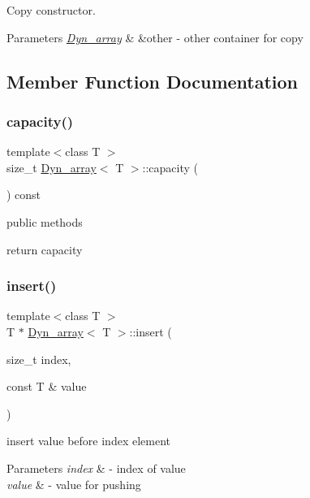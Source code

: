 Copy constructor. 


\begin{DoxyParams}{Parameters}
{\em \hyperlink{classDyn__array}{Dyn\+\_\+array}} & \&other -\/ other container for copy \\
\hline
\end{DoxyParams}


\subsection{Member Function Documentation}
\mbox{\label{classDyn__array_a36c5289ec13ee40366fe3b095b2347bf}} 
\subsubsection{\texorpdfstring{capacity()}{capacity()}}
{\footnotesize\ttfamily template$<$class T $>$ \\
size\+\_\+t \hyperlink{classDyn__array}{Dyn\+\_\+array}$<$ T $>$\+::capacity (\begin{DoxyParamCaption}{ }\end{DoxyParamCaption}) const}



public methods 

return capacity \mbox{\label{classDyn__array_a4b261db6ebc4b4b13136e262c955c71a}} 
\subsubsection{\texorpdfstring{insert()}{insert()}}
{\footnotesize\ttfamily template$<$class T $>$ \\
T $\ast$ \hyperlink{classDyn__array}{Dyn\+\_\+array}$<$ T $>$\+::insert (\begin{DoxyParamCaption}\item[{size\+\_\+t}]{index,  }\item[{const T \&}]{value }\end{DoxyParamCaption})}



insert value before index element 


\begin{DoxyParams}{Parameters}
{\em index} & -\/ index of value \\
\hline
{\em value} & -\/ value for pushing \\
\hline
\end{DoxyParams}
\mbox{\label{classDyn__array_a24797d477a7655bf37d1b1dd97eac1e3}} 
